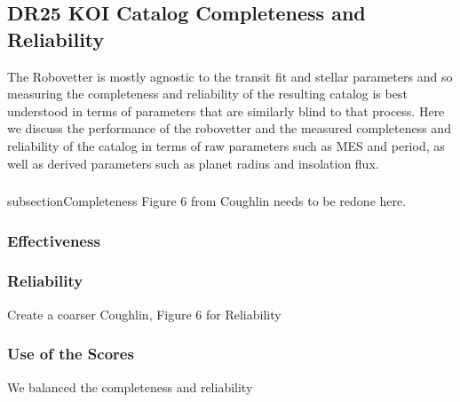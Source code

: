 \subsection{DR25 KOI Catalog Completeness and Reliability}
The Robovetter is mostly agnostic to the transit fit and stellar parameters and so measuring the completeness and reliability of the resulting catalog is best understood in terms of parameters that are similarly blind to that process.  Here we discuss the performance of the robovetter and the measured completeness and reliability of the catalog in terms of raw parameters such as MES and period, as well as derived parameters such as planet radius and insolation flux. 

\subsubsection{}subsection{Completeness}
Figure 6 from Coughlin needs to be redone here.


\subsubsection{Effectiveness}

\subsubsection{Reliability}
Create a coarser Coughlin, Figure 6 for Reliability 


\subsubsection{Use of the Scores}
We balanced the completeness and reliability

